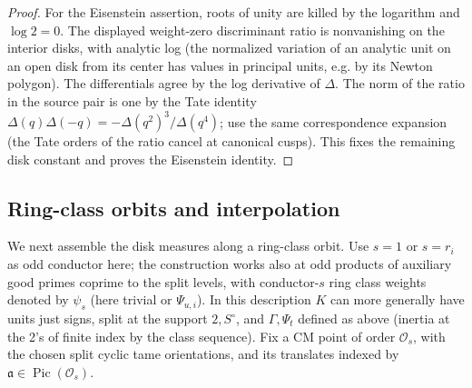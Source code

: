 \begin{proof}
For the Eisenstein assertion, roots of unity are killed by the logarithm
and \(\log 2=0\).  The displayed weight-zero discriminant ratio is nonvanishing on the interior disks, with analytic log (the normalized variation of an analytic unit on an open disk from its center has values in principal units, e.g. by its Newton polygon). The differentials agree by the log derivative of \(\Delta\). The norm of the ratio in the source pair is one by the Tate identity \(\Delta(q)\Delta(-q)=-\Delta(q^2)^3/\Delta(q^4)\); use the same correspondence expansion (the Tate orders of the ratio cancel at canonical cusps). This fixes the remaining disk constant and proves the Eisenstein identity.
\end{proof}

\subsection{Ring-class orbits and interpolation}

We next assemble the disk measures along a ring-class orbit. Use \(s=1\) or \(s=r_i\) as odd conductor here; the construction works also at odd products of auxiliary good primes coprime to the split levels, with conductor-\(s\) ring class weights denoted by \(\psi_s\) (here trivial or \(\Psi_{u,i}\)). In this description \(K\) can more generally have units just signs, split at the support \(2,S^\circ\), and \(\Gamma,\Psi_t\) defined as above (inertia at the 2's of finite index by the class sequence). Fix a CM point of order \(\mathcal O_s\), with the chosen split cyclic tame
orientations, and its translates indexed by
\(\mathfrak a\in\operatorname{Pic}(\mathcal O_s)\).

